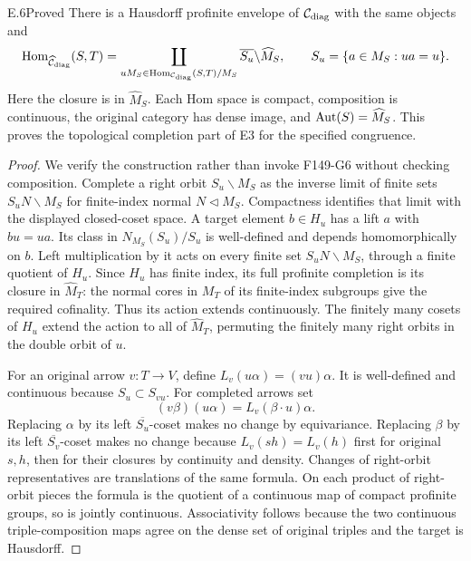 \begin{claim}{E.6}{Proved}
There is a Hausdorff profinite envelope of
$\mathcal C_{\rm diag}$ with the same objects and
\[
\operatorname{Hom}_{\widehat{\mathcal C}_{\rm diag}}(S,T)
 =\coprod_{uM_S\in\operatorname{Hom}_{\mathcal C_{\rm diag}}(S,T)/M_S}
          \overline{S_u}\backslash\widehat M_S,
 \qquad S_u=\{a\in M_S:ua=u\}.
\]
Here the closure is in $\widehat M_S$. Each Hom space is compact,
composition is continuous, the original category has dense image,
and $\operatorname{Aut}(S)=\widehat M_S$. This proves the topological
completion part of E3 for the specified congruence.
\end{claim}
\begin{proof}
We verify the construction rather than invoke F149-G6 without
checking composition. Complete a right orbit $S_u\backslash M_S$
as the inverse limit of finite sets $S_uN\backslash M_S$ for
finite-index normal $N\lhd M_S$. Compactness identifies that
limit with the displayed closed-coset space. A target element
$b\in H_u$ has a lift $a$ with $bu=ua$. Its class in
$N_{M_S}(S_u)/S_u$ is well-defined and depends homomorphically
on $b$. Left multiplication by it acts on every finite set
$S_uN\backslash M_S$, through a finite quotient of $H_u$.
Since $H_u$ has finite index, its full profinite completion is
its closure in $\widehat M_T$: the normal cores in $M_T$ of
its finite-index subgroups give the required cofinality.
Thus its action extends continuously. The finitely many cosets
of $H_u$ extend the action to all of $\widehat M_T$, permuting
the finitely many right orbits in the double orbit of $u$.

For an original arrow $v:T\to V$, define
$L_v(u\alpha)=(vu)\alpha$. It is well-defined and continuous
because $S_u\subset S_{vu}$. For completed arrows set
\[
              (v\beta)(u\alpha)=L_v(\beta\cdot u)\alpha.
\]
Replacing $\alpha$ by its left $\overline{S_u}$-coset makes
no change by equivariance. Replacing $\beta$ by its left
$\overline{S_v}$-coset makes no change because
$L_v(sh)=L_v(h)$ first for original $s,h$, then for their
closures by continuity and density. Changes of right-orbit
representatives are translations of the same formula. On each
product of right-orbit pieces the formula is the quotient of a
continuous map of compact profinite groups, so is jointly
continuous. Associativity follows because the two continuous
triple-composition maps agree on the dense set of original
triples and the target is Hausdorff.


\end{proof}
